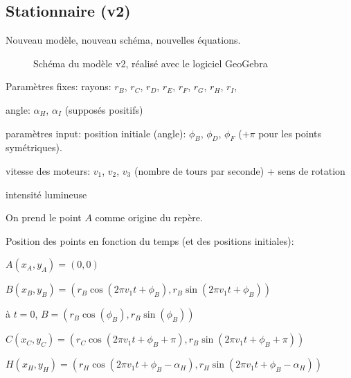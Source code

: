 \documentclass[11pt,a4paper]{article}
\begin{document}
\subsection{Stationnaire (v2)}

Nouveau modèle, nouveau schéma, nouvelles équations.

\begin{figure}[H] 
\caption{Schéma du modèle v2, réalisé avec le logiciel GeoGebra}
\end{figure}


Paramètres fixes: 
rayons: $r_B$, $r_C$, $r_D$, $r_E$, $r_F$, $r_G$, $r_H$, $r_I$,
 
angle: $\alpha_H$,  $\alpha_I$ (supposés positifs)


paramètres input: 
position initiale (angle): $\phi_B$, $\phi_D$, $\phi_F$
($+ \pi$ pour les points symétriques).

vitesse des moteurs: $v_1$, $v_2$, $v_3$ (nombre de tours par seconde) + sens de rotation

intensité lumineuse


On prend le point $A$ comme origine du repère.

Position des points en fonction du temps (et des positions initiales):

$A(x_A,y_A) = (0,0)$

$B(x_B,y_B) = (r_B \cos(2 \pi v_1 t + \phi_B),r_B \sin(2 \pi v_1 t + \phi_B))$

à $t=0$, $B = (r_B \cos(\phi_B), r_B \sin(\phi_B))$

$C(x_C,y_C) = (r_C \cos(2 \pi v_1 t + \phi_B + \pi),r_B \sin(2 \pi v_1 t + \phi_B + \pi))$

$H(x_H,y_H) = ( r_H \cos(2 \pi v_1 t + \phi_B - \alpha_H), r_H \sin(2 \pi v_1 t + \phi_B - \alpha_H))$
\end{document}
